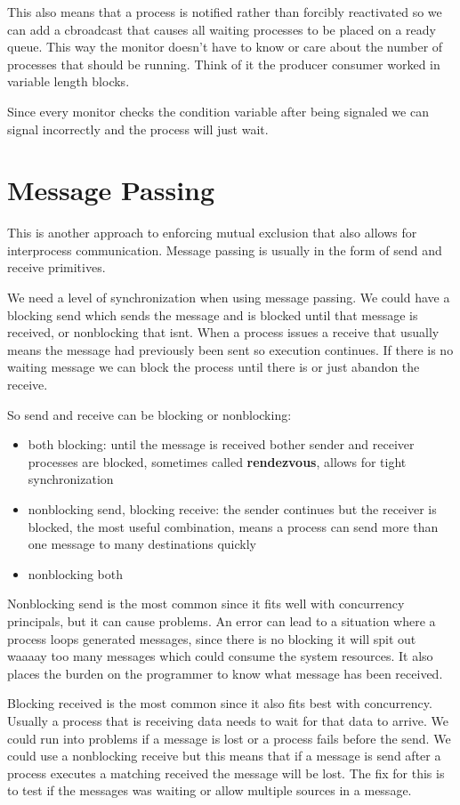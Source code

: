 \documentclass[12pt]{article}
\begin{document}
This also means that a process is notified rather than forcibly reactivated so we can add a cbroadcast that causes all waiting processes to be placed on a ready queue. This way the monitor doesn't have to know or care about the number of processes that should be running. Think of it the producer consumer worked in variable length blocks.

Since every monitor checks the condition variable after being signaled we can signal incorrectly and the process will just wait.

\section{Message Passing}
This is another approach to enforcing mutual exclusion that also allows for interprocess communication. Message passing is usually in the form  of send and receive primitives.

We need a level of synchronization when using message passing. We could have a blocking send which sends the message and is blocked until that message is received, or nonblocking that isnt. When a process issues a receive that usually means the message had previously been sent so execution continues. If there is no waiting message we can block the process until there is or just abandon the receive.

So send and receive can be blocking or nonblocking:
\begin{itemize}
    \item both blocking: until the message is received bother sender and receiver processes are blocked, sometimes called \textbf{rendezvous}, allows for tight synchronization
    \item nonblocking send, blocking receive: the sender continues but the receiver is blocked, the most useful combination, means a process can send more than one message to many destinations quickly
    \item nonblocking both
\end{itemize}

Nonblocking send is the most common since it fits well with concurrency principals, but it can cause problems. An error can lead to a situation where a process loops generated messages, since there is no blocking it will spit out waaaay too many messages which could consume the system resources. It also places the burden on the programmer to know what message has been received.

Blocking received is the most common since it also fits best with concurrency. Usually a process that is receiving data needs to wait for that data to arrive. We could run into problems if a message is lost or a process fails before the send. We could use a nonblocking receive but this means that if a message is send after a process executes a matching received the message will be lost. The fix for this is to test if the messages was waiting or allow multiple sources in a message.
\end{document}
